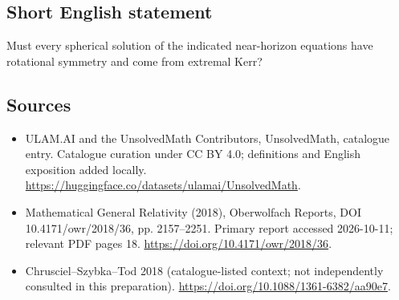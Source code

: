 \documentclass[11pt]{article}
\begin{document}
\subsection{Short English statement}
Must every spherical solution of the indicated near-horizon equations have rotational symmetry and come from extremal Kerr?
\subsection{Sources}
\begin{itemize}
\item[\hypertarget{source:statement:1}{S1}] ULAM.AI and the UnsolvedMath Contributors, UnsolvedMath, catalogue entry. Catalogue curation under CC BY 4.0; definitions and English exposition added locally.
\url{https://huggingface.co/datasets/ulamai/UnsolvedMath}.
\item[\hypertarget{source:statement:2}{S2}] Mathematical General Relativity (2018), Oberwolfach Reports, DOI 10.4171/owr/2018/36, pp. 2157--2251. Primary report accessed 2026-10-11; relevant PDF pages 18.
\url{https://doi.org/10.4171/owr/2018/36}.
\item[\hypertarget{source:statement:3}{S3}] Chrusciel--Szybka--Tod 2018 (catalogue-listed context; not independently consulted in this preparation).
\url{https://doi.org/10.1088/1361-6382/aa90e7}.
\end{itemize}
\label{end:statement}
\end{document}
